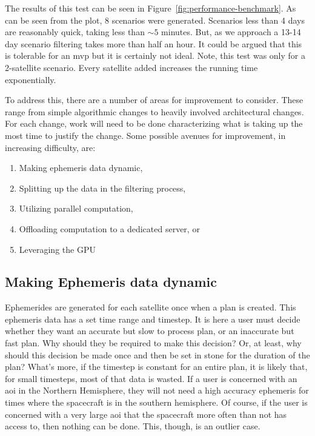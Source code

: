 The results of this test can be seen in Figure~\ref{fig:performance-benchmark}.
As can be seen from the plot, 8 scenarios were generated. Scenarios less than 4
days are reasonably quick, taking less than $\sim5$ minutes. But, as we
approach a 13-14 day scenario filtering takes more than half an hour. It could
be argued that this is tolerable for an \gls{mvp} but it is certainly not
ideal.  Note, this test was only for a 2-satellite scenario. Every satellite
added increases the running time exponentially. 

To address this, there are a number of areas for improvement to consider.
These range from simple algorithmic changes to heavily involved architectural
changes. For each change, work will need to be done characterizing what is
taking up the most time to justify the change. Some possible avenues for
improvement, in increasing difficulty, are:

\begin{enumerate}
    \item Making ephemeris data dynamic,
    \item Splitting up the data in the filtering process,
    \item Utilizing parallel computation,
    \item Offloading computation to a dedicated server, or
    \item Leveraging the GPU
\end{enumerate}


\subsection{Making Ephemeris data dynamic}

Ephemerides are generated for each satellite once when a plan is created. This
ephemeris data has a set time range and timestep. It is here a user must decide
whether they want an accurate but slow to process plan, or an inaccurate but
fast plan. Why should they be required to make this decision? Or, at least, why
should this decision be made once and then be set in stone for the duration of
the plan? What's more, if the timestep is constant for an entire plan, it is
likely that, for small timesteps, most of that data is wasted. If a user is
concerned with an \gls{aoi} in the Northern Hemisphere, they will not need a
high accuracy ephemeris for times where the spacecraft is in the southern
hemisphere. Of course, if the user is concerned with a very large \gls{aoi}
that the spacecraft more often than not has access to, then nothing can be
done. This, though, is an outlier case.

